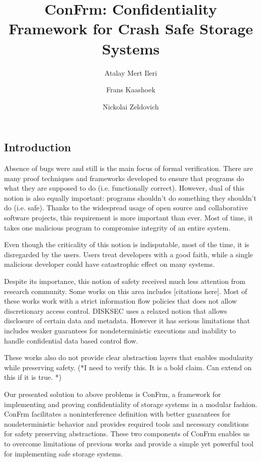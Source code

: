 \documentclass[onecolumn]{paper}
\title{ConFrm: Confidentiality Framework for Crash Safe Storage Systems}
\author{Atalay Mert Ileri \and Frans Kaashoek \and Nickolai Zeldovich}
\begin{document}
\maketitle

\subsection*{Introduction}
Absence of bugs were and still is the main focus of formal verification. There are many proof techniques and frameworks developed to ensure that programs do what they are supposed to do (i.e. functionally correct). However, dual of this notion is also equally important: programs shouldn't do something they shouldn't do (i.e. safe). Thanks to the widespread usage of open source and collaborative software projects, this requirement is more important than ever. Most of time, it takes one malicious program to compromise integrity of an entire system.

Even though the criticality of this notion is indisputable, most of the time, it is disregarded by the users. Users treat developers with a good faith, while a single malicious developer could have catastrophic effect on many systems.

Despite its importance, this notion of safety received much less attention from research community. Some works on this area includes {\color{red} [citations here]}. Most of these works work with a strict information flow policies that does not allow discretionary access control. {\color{red}DISKSEC} uses a relaxed notion that allows disclosure of certain data and metadata. However it has serious limitations that includes weaker guarantees for nondeterministic executions and inability to handle confidential data based control flow.

These works also do not provide clear abstraction layers that enables modularity while preserving safety. (*I need to verify this. It is a bold claim. Can extend on this if it is true. *)

Our presented solution to above problems is ConFrm, a framework for implementing and proving confidentiality of storage systems in a modular fashion. ConFrm facilitates a noninterference definition with better guarantees for nondeterministic behavior and provides required tools and necessary conditions for safety preserving abstractions. These two components of ConFrm enables us to overcome limitations of previous works and provide a simple yet powerful tool for implementing safe storage systems.
\end{document}
